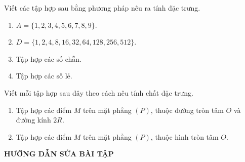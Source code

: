 \documentclass[Main.tex]{subfiles}
\begin{document}
	\begin{bt}%
		Viết các tập hợp sau bằng phương pháp nêu ra tính đặc trưng.
		\begin{multicols}{2}
			\begin{enumerate}
				\item $ A=\{1,2,3,4,5,6,7,8,9 \} $.%
				\item $ D=\{1,2,4,8,16,32,64,128,256,512\} $.%
				\item Tập hợp các số chẵn.%
				\item Tập hợp các số lẻ.%
			\end{enumerate}
		\end{multicols}	
	\end{bt}
	
	\begin{bt}%
		Viết mỗi tập hợp sau đây theo cách nêu tính chất đặc trưng.
		\begin{enumerate}
			\item Tập hợp các điểm $M$ trên mặt phẳng $(P)$, thuộc đường tròn tâm $O$ và đường kính $2R$.
			\item Tập hợp các điểm $M$ trên mặt phẳng $(P)$, thuộc hình tròn tâm $O$.
		\end{enumerate}
	\end{bt}
	
	\begin{center}
		{\bfseries\sffamily\color{\mauchinh} HƯỚNG DẪN SỬA BÀI TẬP}
	\end{center}
	
\end{document}
